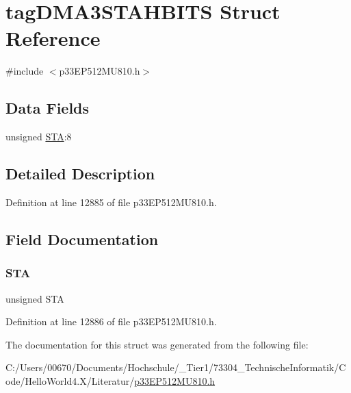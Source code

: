 \hypertarget{structtag_d_m_a3_s_t_a_h_b_i_t_s}{}\section{tag\+D\+M\+A3\+S\+T\+A\+H\+B\+I\+TS Struct Reference}
\label{structtag_d_m_a3_s_t_a_h_b_i_t_s}


{\ttfamily \#include $<$p33\+E\+P512\+M\+U810.\+h$>$}

\subsection*{Data Fields}
\begin{DoxyCompactItemize}
\item 
unsigned \hyperlink{structtag_d_m_a3_s_t_a_h_b_i_t_s_a0eec78ddd2c12af678d5fab70fe62d14}{S\+TA}\+:8
\end{DoxyCompactItemize}


\subsection{Detailed Description}


Definition at line 12885 of file p33\+E\+P512\+M\+U810.\+h.



\subsection{Field Documentation}
\mbox{\label{structtag_d_m_a3_s_t_a_h_b_i_t_s_a0eec78ddd2c12af678d5fab70fe62d14}} 
\subsubsection{\texorpdfstring{S\+TA}{STA}}
{\footnotesize\ttfamily unsigned S\+TA}



Definition at line 12886 of file p33\+E\+P512\+M\+U810.\+h.



The documentation for this struct was generated from the following file\+:\begin{DoxyCompactItemize}
\item 
C\+:/\+Users/00670/\+Documents/\+Hochschule/\+\_\+\+Tier1/73304\+\_\+\+Technische\+Informatik/\+Code/\+Hello\+World4.\+X/\+Literatur/\hyperlink{p33_e_p512_m_u810_8h}{p33\+E\+P512\+M\+U810.\+h}\end{DoxyCompactItemize}
